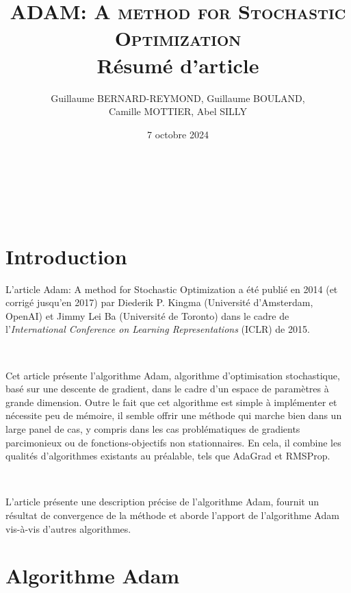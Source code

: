 \documentclass[11pt,a4paper, french]{article}
\title{\textsc{ADAM: A method for Stochastic Optimization}\\
Résumé d'article}
\author{Guillaume BERNARD-REYMOND, Guillaume BOULAND,\\ Camille MOTTIER, Abel SILLY}
\date{7 octobre 2024}
\theoremstyle{definition}
\begin{document}
\maketitle

\


\vspace{1cm}  %
\tableofcontents
\vspace{1cm} 

\


\section{Introduction}

L'article \og Adam: A method for Stochastic Optimization \cite{kingma2017adammethodstochasticoptimization}\fg{} a été publié en 2014 (et corrigé jusqu'en 2017) par Diederik P. Kingma (Université d'Amsterdam, OpenAI) et Jimmy Lei Ba (Université de Toronto) dans le cadre de l'\textit{International Conference on Learning Representations} (ICLR) de 2015. 

\

Cet article présente l'algorithme Adam, algorithme d'optimisation stochastique, basé sur une descente de gradient, dans le cadre d'un espace de paramètres à grande dimension.
Outre le fait que cet algorithme est simple à implémenter et nécessite peu de mémoire, il semble offrir une méthode qui marche bien dans un large panel de cas, y compris dans les cas problématiques de gradients parcimonieux ou de fonctions-objectifs non stationnaires. En cela, il combine les qualités d'algorithmes existants au préalable, tels que AdaGrad et RMSProp.

\

L'article présente une description précise de l'algorithme Adam, fournit un résultat de convergence de la méthode et aborde l'apport de l'algorithme Adam vis-à-vis d'autres algorithmes. 



\section{Algorithme Adam}
\end{document}
